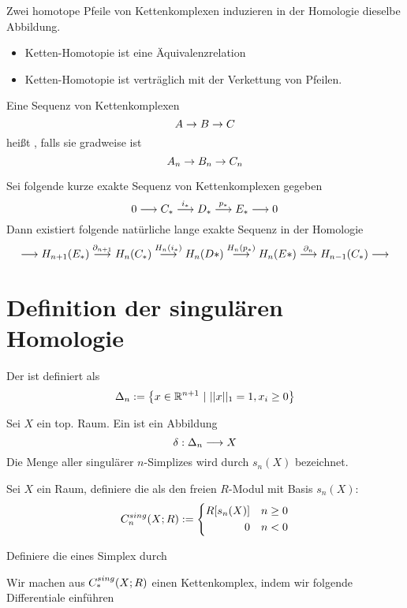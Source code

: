 \Lem{}
Zwei homotope Pfeile von Kettenkomplexen induzieren in der Homologie dieselbe Abbildung.

\Bem{}
\begin{itemize}
\item Ketten-Homotopie ist eine Äquivalenzrelation
\item Ketten-Homotopie ist verträglich mit der Verkettung von Pfeilen.
\end{itemize}

\Def{}
Eine Sequenz von Kettenkomplexen
\[A \overset{}{\rightarrow} B \overset{}{\rightarrow} C \]
heißt , falls sie gradweise  ist
\[ A_n \overset{}{\rightarrow} B_n \overset{}{\rightarrow} C_n \]

\Satz{}
Sei folgende kurze exakte Sequenz von Kettenkomplexen gegeben
\[0 \overset{}{\longrightarrow} C_* \overset{i_*}{\longrightarrow} D_* \overset{p_*}{\longrightarrow} E_* \overset{}{\longrightarrow} 0 \]
Dann existiert folgende natürliche lange exakte Sequenz in der Homologie
\[ \overset{}{\longrightarrow} H_{n+1}(E_*) \overset{\partial_{n+1}}{\longrightarrow} H_n(C_*) \overset{H_n(i_*)}{\longrightarrow} H_n(D*) \overset{H_n(p_*)}{\longrightarrow} H_n(E*) \overset{\partial_n}{\longrightarrow} H_{n-1}(C_*) \overset{}{\longrightarrow}  \]

\section{Definition der singulären Homologie}

\Def{}
Der  ist definiert als
\[\Delta_n := \left\lbrace x \in \mathbb{R}^{n+1}~|~||x||_1 = 1, x_i \geq 0 \right\rbrace \]

\Def{}
Sei $X$ ein top. Raum. Ein  ist ein Abbildung
\[ \delta : \Delta_n \overset{}{\longrightarrow} X \]
Die Menge aller singulärer $n$-Simplizes wird durch $s_n(X)$ bezeichnet.

\Def{}
Sei $X$ ein Raum, definiere die  als den freien $R$-Modul mit Basis $s_n(X)$:
\begin{align*}
C^{sing}_{n}(X;R) := \left\lbrace
\begin{aligned}
R[s_n(X)] && n \geq 0\\
0 && n < 0
\end{aligned}
\right.
\end{align*}

\Def{}
Definiere die  eines Simplex durch

\Def{}
Wir machen aus $C^{sing}_{*}(X;R)$ einen Kettenkomplex, indem wir folgende Differentiale einführen

